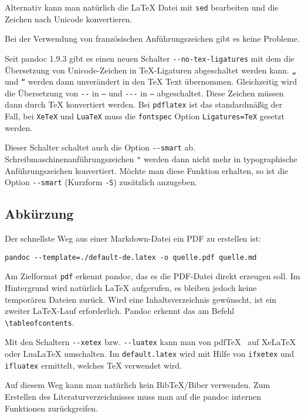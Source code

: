 \documentclass[11pt,ngerman,a4paper]{article}
\begin{document}
Alternativ kann man natürlich die LaTeX Datei mit \texttt{sed}
bearbeiten und die Zeichen nach Unicode konvertieren.

Bei der Verwendung von französischen Anführungszeichen gibt es keine
Probleme.

Seit pandoc 1.9.3 gibt es einen neuen Schalter
\texttt{-{}-no-tex-ligatures} mit dem die Übersetzung von
Unicode-Zeichen in TeX-Ligaturen abgeschaltet werden kann. \texttt{„}
und \texttt{``} werden dann unverändert in den TeX Text übernommen.
Gleichzeitig wird die Übersetzung von \texttt{-{}-} in \texttt{--} und
\texttt{-{}-{}-} in \texttt{---} abgeschaltet. Diese Zeichen müssen dann
durch TeX konvertiert werden. Bei \texttt{pdflatex} ist das
standardmäßig der Fall, bei \texttt{XeTeX} und \texttt{LuaTeX} muss die
\texttt{fontspec} Option \texttt{Ligatures=TeX} gesetzt werden.

Dieser Schalter schaltet auch die Option \texttt{-{}-smart} ab.
Schreibmaschinenanführungszeichen \texttt{"} werden dann nicht mehr in
typographische Anführungszeichen konvertiert. Möchte man diese Funktion
erhalten, so ist die Option \texttt{-{}-smart} (Kurzform \texttt{-S})
zusätzlich anzugeben.

\subsection{Abkürzung}

Der schnellste Weg aus einer Markdown-Datei ein PDF zu erstellen ist:

\begin{verbatim}
pandoc --template=./default-de.latex -o quelle.pdf quelle.md
\end{verbatim}

Am Zielformat \texttt{pdf} erkennt pandoc, das es die PDF-Datei direkt
erzeugen soll. Im Hintergrund wird natürlich LaTeX aufgerufen, es
bleiben jedoch keine temporären Dateien zurück. Wird eine
Inhaltsverzeichnis gewünscht, ist ein zweiter LaTeX-Lauf erforderlich.
Pandoc erkennt das am Befehl \texttt{\textbackslash{}tableofcontents}.

Mit den Schaltern \texttt{-{}-xetex} bzw. \texttt{-{}-luatex} kann man
von pdfTeX~ auf XeLaTeX oder LuaLaTeX umschalten. Im
\texttt{default.latex} wird mit Hilfe von \texttt{ifxetex} und
\texttt{ifluatex} ermittelt, welches TeX verwendet wird.

Auf diesem Weg kann man natürlich kein BibTeX/Biber verwenden. Zum
Erstellen des Literaturverzeichnisses muss man auf die pandoc internen
Funktionen zurückgreifen.
\end{document}
